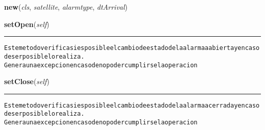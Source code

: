     \label{GroundSegment:models:Alarm:Alarm:Alarm:new}

    \vspace{0.5ex}

\hspace{.8\funcindent}\begin{boxedminipage}{\funcwidth}

    \raggedright \textbf{new}(\textit{cls}, \textit{satellite}, \textit{alarmtype}, \textit{dtArrival})

\setlength{\parskip}{2ex}
\setlength{\parskip}{1ex}
    \end{boxedminipage}

    \label{GroundSegment:models:Alarm:Alarm:Alarm:setOpen}

    \vspace{0.5ex}

\hspace{.8\funcindent}\begin{boxedminipage}{\funcwidth}

    \raggedright \textbf{setOpen}(\textit{self})

    \vspace{-1.5ex}

    \rule{\textwidth}{0.5\fboxrule}
\setlength{\parskip}{2ex}
\begin{alltt}

Este metodo verifica si es posible el cambio de estado de la alarma a abierta y en caso de ser posible lo realiza.
Genera una excepcion en caso de no poder cumplirse la operacion
\end{alltt}

\setlength{\parskip}{1ex}
    \end{boxedminipage}

    \label{GroundSegment:models:Alarm:Alarm:Alarm:setClose}

    \vspace{0.5ex}

\hspace{.8\funcindent}\begin{boxedminipage}{\funcwidth}

    \raggedright \textbf{setClose}(\textit{self})

    \vspace{-1.5ex}

    \rule{\textwidth}{0.5\fboxrule}
\setlength{\parskip}{2ex}
\begin{alltt}

Este metodo verifica si es posible el cambio de estado de la alarma a cerrada y en caso de ser posible lo realiza.
Genera una excepcion en caso de no poder cumplirse la operacion
\end{alltt}

\setlength{\parskip}{1ex}
    \end{boxedminipage}

